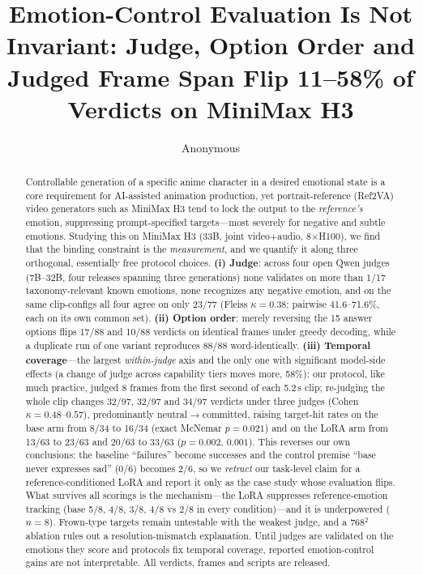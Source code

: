 \documentclass[10pt,twocolumn]{article}
\title{\textbf{Emotion-Control Evaluation Is Not Invariant: Judge, Option Order and\\ Judged Frame Span Flip 11--58\% of Verdicts on MiniMax H3}}
\author{Anonymous}
\date{}
\begin{document}
\maketitle

\begin{abstract}
Controllable generation of a specific anime character in a desired emotional state is a core
requirement for AI-assisted animation production, yet portrait-reference (Ref2VA) video
generators such as MiniMax H3 tend to lock the output to the \emph{reference's} emotion,
suppressing prompt-specified targets---most severely for negative and subtle emotions. Studying this
on MiniMax H3 (33B, joint video+audio, 8$\times$H100), we find that the binding constraint is the
\emph{measurement}, and we quantify it along three orthogonal, essentially free protocol choices.
\textbf{(i) Judge}: across four open Qwen judges (7B--32B, four releases spanning three generations) none validates on more
than 1/17 taxonomy-relevant known emotions, none recognizes any negative emotion, and on the same
clip-configs all four agree on only 23/77 (Fleiss $\kappa{=}0.38$; pairwise 41.6--71.6\%, each on its own common set).
\textbf{(ii) Option order}: merely reversing the 15 answer options flips 17/88 and 10/88 verdicts on
identical frames under greedy decoding, while a duplicate run of one variant reproduces 88/88 word-identically. \textbf{(iii) Temporal
coverage}---the largest \emph{within-judge} axis and the only one with significant model-side effects (a change of judge across
capability tiers moves more, 58\%): our protocol, like much practice, judged 8
frames from the first second of each 5.2\,s clip; re-judging the whole clip changes 32/97, 32/97 and 34/97
verdicts under three judges (Cohen $\kappa{=}0.48$--$0.57$), predominantly
neutral$\rightarrow$committed, raising target-hit rates on the base arm from 8/34 to 16/34 (exact
McNemar $p{=}0.021$) and on the LoRA arm from 13/63 to 23/63 and 20/63 to 33/63 ($p{=}0.002$, $0.001$). This
reverses our own conclusions: the baseline ``failures'' become successes and the control premise
``base never expresses sad'' (0/6) becomes 2/6, so we \emph{retract} our task-level claim for a
reference-conditioned LoRA and report it only as the case study whose evaluation flips. What survives
all scorings is the mechanism---the LoRA suppresses reference-emotion tracking (base 5/8, 4/8, 3/8,
4/8 vs 2/8 in every condition)---and it is underpowered ($n{=}8$). Frown-type targets remain
untestable with the weakest judge, and a 768$^2$ ablation rules out a resolution-mismatch
explanation. Until judges are validated on the emotions they score and protocols fix temporal
coverage, reported emotion-control gains are not interpretable. All verdicts, frames and scripts
are released.
\end{abstract}
\end{document}
